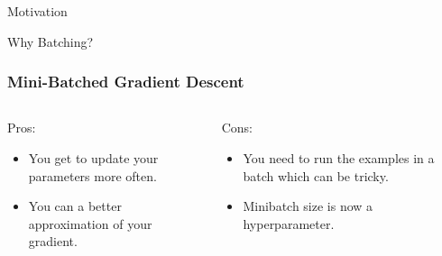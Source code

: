 \documentclass{beamer}
\begin{document}
\begin{section}{Motivation}
\begin{subsection}{Why Batching?}
        \begin{frame}
            \frametitle{Mini-Batched Gradient Descent}
            \begin{columns}
                \begin{column}{0.5\textwidth}
                    Pros:
                    \begin{itemize}
                        \item You get to update your parameters more often.
                        \item You can a better approximation of your gradient.
                    \end{itemize}
                \end{column}
                \begin{column}{0.5\textwidth}
                    Cons:
                    \begin{itemize}
                        \item You need to run the examples in a batch which can be tricky.
                        \item Minibatch size is now a hyperparameter.
                    \end{itemize}
                \end{column}
            \end{columns}
        \end{frame}


\end{subsection}
\end{section}
\end{document}
